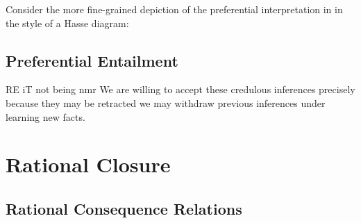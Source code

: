 \begin{example}
	Consider the more fine-grained depiction of the preferential interpretation in 
	in the style of a Hasse diagram:
\end{example}




\subsection{Preferential Entailment}

RE iT not being nmr We are willing to accept these credulous inferences precisely because they may be retracted we may withdraw
previous inferences under learning new facts.

\section{Rational Closure}

\subsection{Rational Consequence Relations}